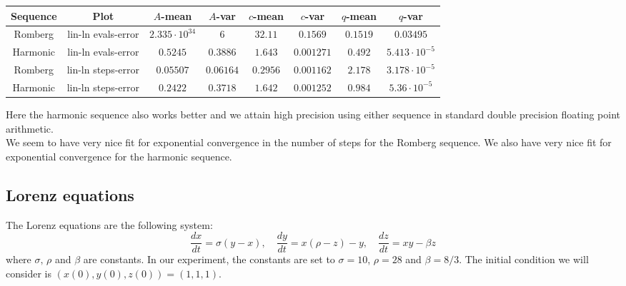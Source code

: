 \begin{table}[H]
    \centering
    \small
     \begin{tabular}{c|c||c|c|c|c|c|c}
Sequence & Plot & \(A\)-mean & \(A\)-var & \(c\)-mean & \(c\)-var & \(q\)-mean & \(q\)-var\\\hline
\rowcolor{red}
Romberg & lin-ln evals-error & \(2.335\cdot 10^{34}\) & \(6\) & \(32.11\) & \(0.1569\) & \(0.1519\) & \(0.03495\) \\
\rowcolor{green}
Harmonic & lin-ln evals-error & \(0.5245\) & \(0.3886\) & \(1.643\) & \(0.001271\) & \(0.492\) & \(5.413\cdot 10^{-5}\) \\
\rowcolor{green}
Romberg & lin-ln steps-error & \(0.05507\) & \(0.06164\) & \(0.2956\) & \(0.001162\) & \(2.178\) & \(3.178\cdot 10^{-5}\) \\
\rowcolor{green}
Harmonic & lin-ln steps-error & \(0.2422\) & \(0.3718\) & \(1.642\) & \(0.001252\) & \(0.984\) & \(5.36\cdot 10^{-5}\) \\
    \end{tabular}
    \label{tab:my_label}
\end{table}

Here the harmonic sequence also works better and we attain high precision using either sequence in standard double precision floating point arithmetic.\\

We seem to have very nice fit for exponential convergence in the number of steps for the Romberg sequence. We also have very nice fit for exponential convergence for the harmonic sequence.

\subsection{Lorenz equations}

The Lorenz equations are the following system: 
\[
\frac{dx}{dt} = \sigma (y-x),\quad \frac{dy}{dt} = x(\rho - z) - y,\quad \frac{dz}{dt} = xy - \beta z
\]
where \(\sigma,\,\rho\) and \(\beta\) are constants. In our experiment, the constants are set to \(\sigma = 10\), \(\rho = 28\) and \(\beta = 8/3\). The initial condition we will consider is \((x(0),y(0),z(0)) = (1,1,1)\).\\

